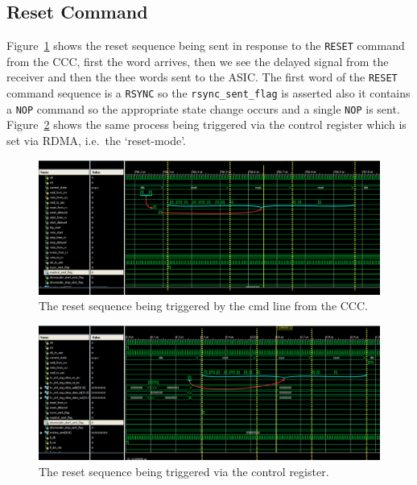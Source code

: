 \subsection{Reset Command} %
\label{sec:reset_command}
Figure~\ref{fig:isim_reset_cmd} shows the reset sequence being sent in response to the \texttt{RESET} command from the CCC, first the word arrives, then we see the delayed signal from the receiver and then the thee words sent to the ASIC. The first word of the \texttt{RESET} command sequence is a \texttt{RSYNC} so the \texttt{rsync\_sent\_flag} is asserted also it contains a \texttt{NOP} command so the appropriate state change occurs and a single \texttt{NOP} is sent. Figure~\ref{fig:isim_reset_rdma} shows the same process being triggered via the control register which is set via RDMA, i.e.\ the `reset-mode'.
\begin{figure}[htbp]
  \centering
  \includegraphics[width=\textwidth]{images/isim/edited/reset_cmd.png}
  \caption{The reset sequence being triggered by the cmd line from the CCC.}
  \label{fig:isim_reset_cmd}
\end{figure}
\begin{figure}[htbp]
  \centering
  \includegraphics[width=\textwidth]{images/isim/edited/reset_rdma.png}
  \caption{The reset sequence being triggered via the control register.}
  \label{fig:isim_reset_rdma}
\end{figure}
